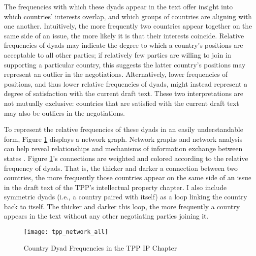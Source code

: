 \documentclass[12pt]{article}
\begin{document}
The frequencies with which these dyads appear in the text offer insight into which countries' interests overlap, 
and which groups of countries are 
aligning with one another. Intuitively, the more frequently two countries appear together on the same 
side of an issue, the more likely it is that their interests coincide. Relative frequencies of 
dyads may 
indicate the degree to which a country's positions are acceptable to all other parties; if relatively 
few parties are willing to join in supporting a particular country, this suggests the latter country's 
positions may represent an outlier in the negotiations. Alternatively, lower frequencies of positions, 
and thus lower relative frequencies of dyads, might instead represent a degree of satisfaction with 
the current draft text. These two interpretations are not mutually exclusive: countries that are 
satisfied with the current draft text may also be outliers in the negotiations.

To represent the relative frequencies of these dyads in an easily understandable form, 
Figure \ref{fig_tpp_network_graph} displays a network graph. Network graphs and network analysis can help reveal relationships and 
mechanisms of 
information exchange between states \citep{kinne2013network}.
Figure \ref{fig_tpp_network_graph}'s connections are weighted and colored 
according to the 
relative frequency of dyads. That is, the thicker and darker a connection between 
two countries, the more frequently those countries appear on the same side of an issue in the draft 
text of the TPP's intellectual property chapter. I also include symmetric dyads (i.e., a country paired with itself) as a loop linking the 
country back to itself. The thicker and darker this loop, the more frequently a country appears in 
the text without any other negotiating parties joining it.

\begin{figure}
\caption{Country Dyad Frequencies in the TPP IP Chapter}
\label{fig_tpp_network_graph}
\centering
\texttt{[image: tpp\_network\_all]}
\end{figure}
\end{document}
